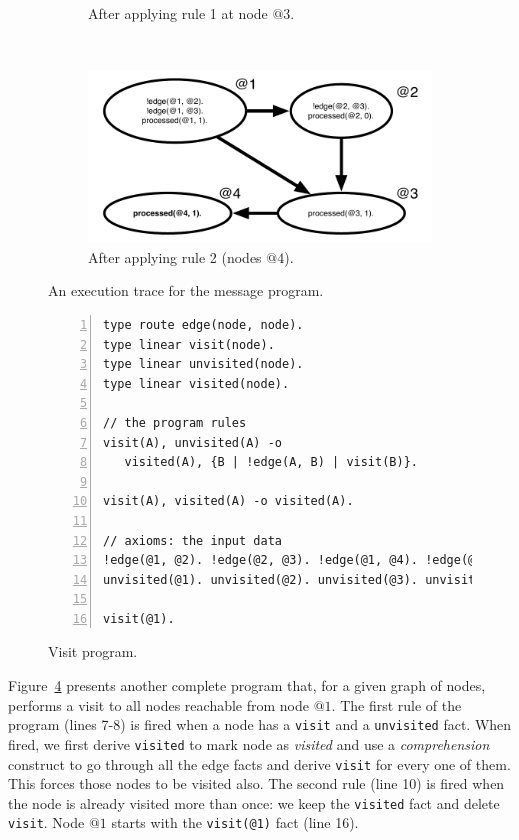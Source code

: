 \begin{figure}[h]
\begin{subfigure}[b]{0.5\textwidth}
                \caption{After applying rule 1 at node $@3$.}
                \label{fig:message_trace3}
        \end{subfigure}%
        ~
        \begin{subfigure}[b]{0.5\textwidth}
                  \includegraphics[width=\textwidth]{message_trace4}
                  \caption{After applying rule 2 (nodes $@4$).}
                  \label{fig:message_trace4}
          \end{subfigure}
        \caption{An execution trace for the message program.}\label{fig:message_trace}
\end{figure}

\begin{figure}[h!]
\small\begin{Verbatim}[numbers=left]
type route edge(node, node).
type linear visit(node).
type linear unvisited(node).
type linear visited(node).

// the program rules
visit(A), unvisited(A) -o
   visited(A), {B | !edge(A, B) | visit(B)}.

visit(A), visited(A) -o visited(A).

// axioms: the input data
!edge(@1, @2). !edge(@2, @3). !edge(@1, @4). !edge(@2, @4).
unvisited(@1). unvisited(@2). unvisited(@3). unvisited(@4).

visit(@1).
\end{Verbatim}
  \caption{Visit program.}
  \label{code:visit}
\end{figure}
\normalsize

Figure~\ref{code:visit} presents another complete \lang program that, for a given graph
of nodes, performs a visit to all nodes reachable from node $@1$.
The first rule of the program (lines 7-8) is fired when a node has a \texttt{visit} and a \texttt{unvisited} fact. When fired, we first derive \texttt{visited} to mark node as \textit{visited} and use a
\emph{comprehension} construct to go through all the edge facts and derive \texttt{visit} for every
one of them. This forces those nodes to be visited also. The second rule (line 10) is fired when the
node is already visited more than once: we keep the \texttt{visited} fact and delete \texttt{visit}.
Node $@1$ starts with the \texttt{visit(@1)} fact (line 16).

